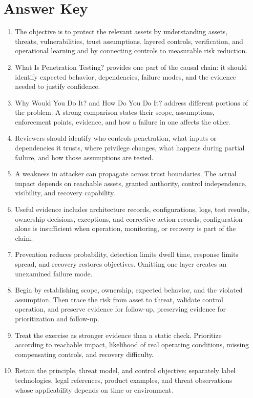 \documentclass[11pt]{article}
\begin{document}
\section*{Answer Key}
\begin{enumerate}
\item The objective is to protect the relevant assets by understanding assets, threats, vulnerabilities, trust assumptions, layered controls, verification, and operational learning and by connecting controls to measurable risk reduction.
\item What Is Penetration Testing? provides one part of the causal chain: it should identify expected behavior, dependencies, failure modes, and the evidence needed to justify confidence.
\item Why Would You Do It? and How Do You Do It? address different portions of the problem. A strong comparison states their scope, assumptions, enforcement points, evidence, and how a failure in one affects the other.
\item Reviewers should identify who controls penetration, what inputs or dependencies it trusts, where privilege changes, what happens during partial failure, and how those assumptions are tested.
\item A weakness in attacker can propagate across trust boundaries. The actual impact depends on reachable assets, granted authority, control independence, visibility, and recovery capability.
\item Useful evidence includes architecture records, configurations, logs, test results, ownership decisions, exceptions, and corrective-action records; configuration alone is insufficient when operation, monitoring, or recovery is part of the claim.
\item Prevention reduces probability, detection limits dwell time, response limits spread, and recovery restores objectives. Omitting one layer creates an unexamined failure mode.
\item Begin by establishing scope, ownership, expected behavior, and the violated assumption. Then trace the risk from asset to threat, validate control operation, and preserve evidence for follow-up, preserving evidence for prioritization and follow-up.
\item Treat the exercise as stronger evidence than a static check. Prioritize according to reachable impact, likelihood of real operating conditions, missing compensating controls, and recovery difficulty.
\item Retain the principle, threat model, and control objective; separately label technologies, legal references, product examples, and threat observations whose applicability depends on time or environment.
\end{enumerate}
\end{document}
